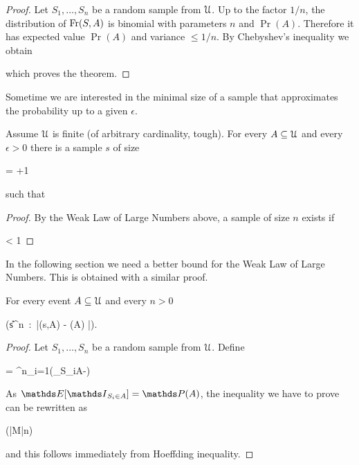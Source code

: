 \documentclass[scombinatorics.tex]{subfiles}
\begin{document}
\begin{proof}
  Let $S_1,\dots,S_n$ be a random sample from $\EuScript U$.
  Up to the factor $1/n$, the distribution of $\mathop{\rm Fr}(S,A)$ is binomial with parameters $n$ and $\Pr(A)$.
  Therefore it has expected value $\Pr(A)$ and  variance $\le1/n$. 
  By Chebyshev's inequality we obtain 
  
  {\le}
  {}

  which proves the theorem.
\end{proof}

Sometime we are interested in the minimal size of a sample that approximates the probability up to a given $\epsilon$.

\begin{corollary}\label{corl_wlln}
  Assume $\EuScript U$ is finite (of arbitrary cardinality, tough).
  For every $A\subseteq\EuScript U$ and every $\epsilon>0$ there is a sample $s$ of size

      {=}
      {\left\lfloor{}+1\right\rfloor} 
      
  such that

\end{corollary}

\begin{proof}
  By the Weak Law of Large Numbers above, a sample of size $n$ exists if

      {<}
      {1}
\end{proof}

In the following section we need a better bound for the Weak Law of Large Numbers.
This is obtained with a similar proof.

\begin{void_thm}\label{WLLN_exp}
  For every event $A\subseteq\EuScript U$ and every $n>0$
  
  {\ge}
  {\Pr \Big(s\in\U^n\ :\ \big|\Fr(s,A) - \Pr(A)  \big|\ge\epsilon\Big).}
\end{void_thm}

\begin{proof}
  Let $S_1,\dots,S_n$ be a random sample from $\EuScript U$.
  Define
  
  {=}
  {\sum^n_{i=1}\Big(\Indicator_{S_i\in A}-\Ex[\Indicator_{S_i\in A}]\Big)}

  As $\Ex[\Indicator_{S_i\in A}]=\Pr(A)$, the inequality we have to prove can be rewritten as 

  {\ge}
  {\Pr \Big(|M|\ge n\epsilon\Big)}

  and this follows immediately from Hoeffding inequality.
  \end{proof}
\end{document}
